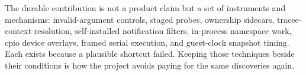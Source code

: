 \documentclass[10pt,twocolumn]{article}
\begin{document}
The durable contribution is not a product claim but a set of instruments and mechanisms: invalid-argument controls, staged probes, ownership sidecars, tracee-context resolution, self-installed notification filters, in-process namespace work, cpio device overlays, framed serial execution, and guest-clock snapshot timing. Each exists because a plausible shortcut failed. Keeping those techniques beside their conditions is how the project avoids paying for the same discoveries again.
\end{document}
